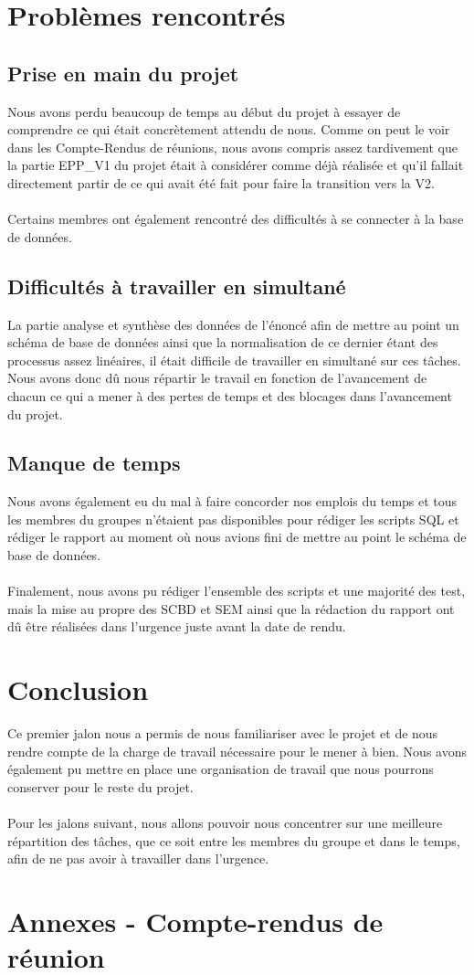 \documentclass{report}
\begin{document}
\chapter{Problèmes rencontrés}
\section{Prise en main du projet}

Nous avons perdu beaucoup de temps au début du projet à essayer
de comprendre ce qui était concrètement attendu de nous.
Comme on peut le voir dans les Compte-Rendus de réunions,
nous avons compris assez tardivement que la partie EPP\_V1 du
projet était à considérer comme déjà réalisée et qu'il fallait
directement partir de ce qui avait été fait pour faire la
transition vers la V2.
\\\\
Certains membres ont également rencontré des difficultés à
se connecter à la base de données.

\section{Difficultés à travailler en simultané}
La partie analyse et synthèse des données de l'énoncé
afin de mettre au point un schéma de base de données ainsi que
la normalisation de ce dernier étant des processus assez
linéaires, il était difficile de travailler en simultané sur
ces tâches. Nous avons donc dû nous répartir le travail
en fonction de l'avancement de chacun ce qui a mener à des
pertes de temps et des blocages dans l'avancement du projet.

\section{Manque de temps}
Nous avons également eu du mal à faire concorder nos emplois
du temps et tous les membres du groupes n'étaient pas disponibles
pour rédiger les scripts SQL et rédiger le rapport 
au moment où nous avions fini de mettre au point le schéma de
base de données.
\\\\
Finalement, nous avons pu rédiger l'ensemble des scripts
et une majorité des test, mais la mise au propre des SCBD et SEM
ainsi que la rédaction du rapport ont dû être réalisées
dans l'urgence juste avant la date de rendu.

\chapter{Conclusion}
Ce premier jalon nous a permis de nous familiariser avec le
projet et de nous rendre compte de la charge de travail
nécessaire pour le mener à bien. Nous avons également pu
mettre en place une organisation de travail que nous pourrons
conserver pour le reste du projet.
\\\\
Pour les jalons suivant, nous allons pouvoir nous concentrer
sur une meilleure répartition des tâches, que ce soit entre
les membres du groupe et dans le temps, afin de ne pas avoir
à travailler dans l'urgence.

\chapter*{Annexes - Compte-rendus de réunion}



\end{document}

